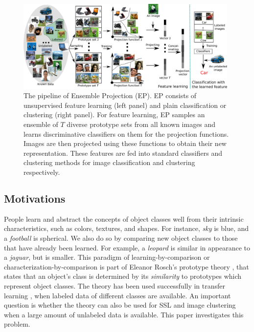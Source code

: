 
\begin{figure}[t]
  \centering
  \includegraphics[width=0.98\textwidth]{./pipeline.jpg}
  \caption{The pipeline of Ensemble Projection (EP). EP consists of
    unsupervised feature learning (left panel) and plain
    classification or clustering (right panel). For feature learning,
    EP samples an ensemble of $T$ diverse prototype sets from all
    known images and learns discriminative classifiers on them for the
    projection functions. Images are then projected using these
    functions to obtain their new representation. These features are
    fed into standard classifiers and clustering methods for image
    classification and clustering respectively.}
\label{fig:pipeline}
\end{figure}

\subsection{Motivations}
People learn and abstract the concepts of object classes well from
their intrinsic characteristics, such as colors, textures, and
shapes. For instance, \emph{sky} is blue, and a \emph{football} is
spherical. We also do so by comparing new object classes to those that
have already been learned. For example, a \emph{leopard} is similar in
appearance to a \emph{jaguar}, but is smaller. This paradigm of
learning-by-comparison or characterization-by-comparison is part of
Eleanor Rosch's prototype theory \citep{Rosch:1978}, that states that
an object's class is determined by its \emph{similarity} to prototypes
which represent object classes. The theory has been used successfully
in transfer learning \citep{Transfer:CVPR:08}, when labeled data of
different classes are available. An important question is whether the
theory can also be used for SSL and image clustering when a large
amount of unlabeled data is available. This paper investigates this
problem.

